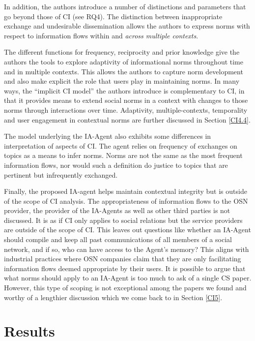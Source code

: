 \documentclass[../thesis.tex]{subfiles}
\begin{document}
In addition, the authors introduce a number of distinctions and
parameters that go beyond those of CI (see RQ4). The distinction between
inappropriate exchange and undesirable dissemination allows the authors
to express norms with respect to information flows within and
\textit{across multiple contexts}.  

The different functions for frequency, reciprocity and prior knowledge
give the authors the tools to explore adaptivity of informational norms
throughout time and in multiple contexts. This allows the authors to
capture norm development and also make explicit the role that users
play in maintaining norms. In many ways, the
``implicit CI model'' the authors
introduce is complementary to CI, in that it provides means to extend
social norms in a context with changes to those norms through
interactions over time. Adaptivity, multiple-contexts, temporality and
user engagement in contextual norms are further discussed in Section
\ref{CI4.4}.

The model underlying the IA-Agent also exhibits some differences in
interpretation of aspects of CI. The agent relies on frequency of
exchanges on topics as a means to infer norms. Norms are not the same
as the most frequent information flows, nor would such a definition do
justice to topics that are pertinent but infrequently exchanged. 

Finally, the proposed IA-agent helps maintain contextual integrity but
is outside of the scope of CI analysis. The appropriateness of
information flows to the OSN provider, the provider of the IA-Agents as
well as other third parties is not discussed. It is as if CI only
applies to social relations but the service providers are outside of
the scope of CI. This leaves out questions like whether an IA-Agent
should compile and keep all past communications of all members of a
social network, and if so, who can have access to the
Agent's memory? This aligns with industrial practices
where OSN companies claim that they are only facilitating information
flows deemed appropriate by their users. It is possible to argue that
what norms should apply to an IA-Agent is too much to ask of a single
CS paper. However, this type of scoping is not exceptional among the
papers we found and worthy of a lengthier discussion which we come back
to in Section \ref{CI5}.

\section{Results}
\label{CI4} 
\end{document}
